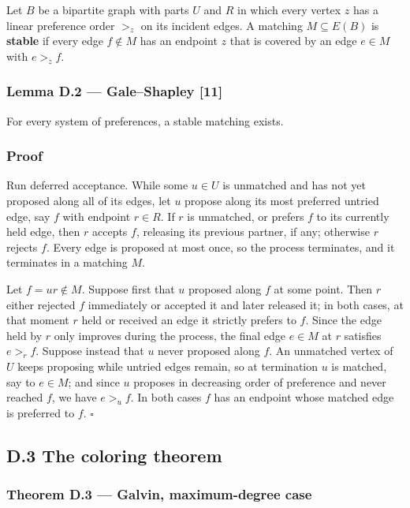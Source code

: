 \documentclass[
  11pt,
]{article}
\begin{document}
Let \(B\) be a bipartite graph with parts \(U\) and \(R\) in which every vertex \(z\) has a linear preference order \(>_z\) on its incident edges. A matching \(M\subseteq E(B)\) is \textbf{stable} if every edge \(f\notin M\) has an endpoint \(z\) that is covered by an edge \(e\in M\) with \(e>_zf\).

\subsubsection{Lemma D.2 --- Gale--Shapley {[}11{]}}\label{lemma-d.2-galeshapley-11}

For every system of preferences, a stable matching exists.

\subsubsection{Proof}\label{proof-8}

Run deferred acceptance. While some \(u\in U\) is unmatched and has not yet proposed along all of its edges, let \(u\) propose along its most preferred untried edge, say \(f\) with endpoint \(r\in R\). If \(r\) is unmatched, or prefers \(f\) to its currently held edge, then \(r\) accepts \(f\), releasing its previous partner, if any; otherwise \(r\) rejects \(f\). Every edge is proposed at most once, so the process terminates, and it terminates in a matching \(M\).

Let \(f=ur\notin M\). Suppose first that \(u\) proposed along \(f\) at some point. Then \(r\) either rejected \(f\) immediately or accepted it and later released it; in both cases, at that moment \(r\) held or received an edge it strictly prefers to \(f\). Since the edge held by \(r\) only improves during the process, the final edge \(e\in M\) at \(r\) satisfies \(e>_rf\). Suppose instead that \(u\) never proposed along \(f\). An unmatched vertex of \(U\) keeps proposing while untried edges remain, so at termination \(u\) is matched, say to \(e\in M\); and since \(u\) proposes in decreasing order of preference and never reached \(f\), we have \(e>_uf\). In both cases \(f\) has an endpoint whose matched edge is preferred to \(f\). \(\square\)

\subsection{D.3 The coloring theorem}\label{d.3-the-coloring-theorem}

\subsubsection{Theorem D.3 --- Galvin, maximum-degree case}\label{theorem-d.3-galvin-maximum-degree-case}
\end{document}
